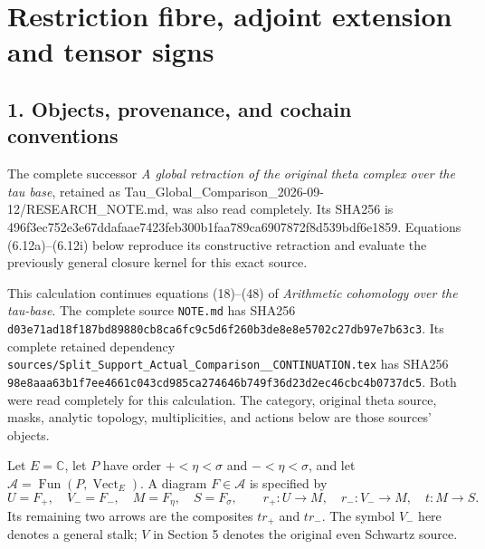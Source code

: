 \documentclass[10pt,a4paper,oneside]{report}
\begin{document}

\endgroup
\clearpage
\chapter{Restriction fibre, adjoint extension and tensor signs}
\begingroup
\section{1. Objects, provenance, and cochain
conventions}\label{proof02:objects-provenance-and-cochain-conventions}

The complete successor \emph{A global retraction of the original theta
complex over the tau base}, retained as
Tau\_Global\_Comparison\_2026-09-12/RESEARCH\_NOTE.md, was also read
completely. Its SHA256 is
496f3ec7\allowbreak{}52e3e67d\allowbreak{}dafaae74\allowbreak{}23feb300\allowbreak{}b1faa789\allowbreak{}ca690787\allowbreak{}2f8d539b\allowbreak{}df6e1859.
Equations (6.12a)--(6.12i) below reproduce its constructive retraction
and evaluate the previously general closure kernel for this exact
source.

This calculation continues equations (18)--(48) of \emph{Arithmetic
cohomology over the tau-base}. The complete source \texttt{NOTE.md} has
SHA256
\texttt{d03e71ad\allowbreak{}18f187bd\allowbreak{}89880cb8\allowbreak{}ca6fc9c5\allowbreak{}d6f260b3\allowbreak{}de8e8e57\allowbreak{}02c27db9\allowbreak{}7e7b63c3}.
Its complete retained dependency
\texttt{sources/\allowbreak{}\allowbreak{}Split\_\allowbreak{}\allowbreak{}Support\_\allowbreak{}\allowbreak{}Actual\_\allowbreak{}\allowbreak{}Comparison\_\allowbreak{}\allowbreak{}\_\allowbreak{}\allowbreak{}CONTINUATION.tex}
has SHA256
\texttt{98e8aaa6\allowbreak{}3b1f7ee4\allowbreak{}661c043c\allowbreak{}d985ca27\allowbreak{}4646b749\allowbreak{}f36d23d2\allowbreak{}ec46cbc4\allowbreak{}b0737dc5}.
Both were read completely for this calculation. The category, original
theta source, masks, analytic topology, multiplicities, and actions
below are those sources' objects.

Let \(E=\mathbb C\), let \(P\) have order \(+<\eta<\sigma\) and
\(-<\eta<\sigma\), and let
\(\mathcal A=\operatorname{Fun}(P,\operatorname{Vect}_E)\). A diagram
\(F\in\mathcal A\) is specified by \[
U=F_+,\quad V_-=F_-,\quad M=F_\eta,\quad S=F_\sigma,
\qquad r_+:U\to M,\quad r_-:V_-\to M,\quad t:M\to S.
\tag{1.1}
\] Its remaining two arrows are the composites \(tr_+\) and \(tr_-\).
The symbol \(V_-\) here denotes a general stalk; \(V\) in Section 5
denotes the original even Schwartz source.
\end{document}
